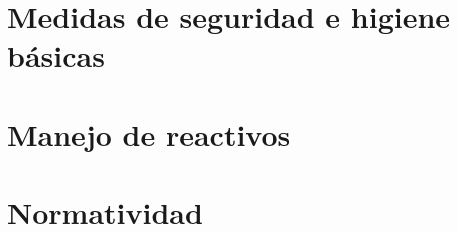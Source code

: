 


\section{Medidas de seguridad e higiene básicas}



\section{Manejo de reactivos}



\section{Normatividad}


